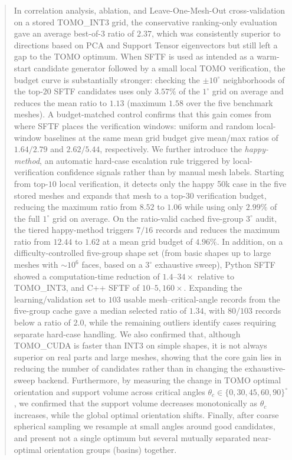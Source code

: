 \documentclass[11pt,a4paper]{article}
\begin{document}
\begin{abstract}
In correlation analysis, ablation, and Leave-One-Mesh-Out cross-validation on a stored TOMO\_INT3 grid,
the conservative ranking-only evaluation gave an average best-of-3 ratio of $2.37$,
which was consistently superior to directions based on PCA and Support Tensor eigenvectors but still left a gap to the TOMO optimum.
When SFTF is used as intended as a warm-start candidate generator followed by a small local TOMO verification,
the budget curve is substantially stronger: checking the $\pm 10^\circ$ neighborhoods of the top-$20$ SFTF candidates uses only $3.57\%$ of the $1^\circ$ grid on average
and reduces the mean ratio to $1.13$ (maximum $1.58$ over the five benchmark meshes).
A budget-matched control confirms that this gain comes from where SFTF places the verification windows:
uniform and random local-window baselines at the same mean grid budget give mean/max ratios of $1.64/2.79$ and $2.62/5.44$, respectively.
We further introduce the \emph{happy-method}, an automatic hard-case escalation rule triggered by local-verification confidence signals rather than by manual mesh labels.
Starting from top-$10$ local verification, it detects only the happy 50k case in the five stored meshes and expands that mesh to a top-$30$ verification budget,
reducing the maximum ratio from $8.52$ to $1.06$ while using only $2.99\%$ of the full $1^\circ$ grid on average.
On the ratio-valid cached five-group $3^\circ$ audit, the tiered happy-method triggers $7/16$ records and reduces the maximum ratio from $12.44$ to $1.62$ at a mean grid budget of $4.96\%$.
In addition, on a difficulty-controlled five-group shape set (from basic shapes up to large meshes with $\sim$$10^6$ faces, based on a $3^\circ$ exhaustive sweep),
Python SFTF showed a computation-time reduction of $1.4$--$34\times$ relative to TOMO\_INT3,
and C++ SFTF of $10$--$5{,}160\times$.
Expanding the learning/validation set to $103$ usable mesh--critical-angle records from the five-group cache gave a median selected ratio of $1.34$,
with $80/103$ records below a ratio of $2.0$, while the remaining outliers identify cases requiring separate hard-case handling.
We also confirmed that, although TOMO\_CUDA is faster than INT3 on simple shapes, it is not always superior on real parts and large meshes,
showing that the core gain lies in reducing the number of candidates rather than in changing the exhaustive-sweep backend.
Furthermore, by measuring the change in TOMO optimal orientation and support volume across critical angles $\theta_c\in\{0,30,45,60,90\}^\circ$,
we confirmed that the support volume decreases monotonically as $\theta_c$ increases, while the global optimal orientation shifts.
Finally, after coarse spherical sampling we resample at small angles around good candidates,
and present not a single optimum but several mutually separated near-optimal orientation groups (basins) together.
\end{abstract}
\end{document}
